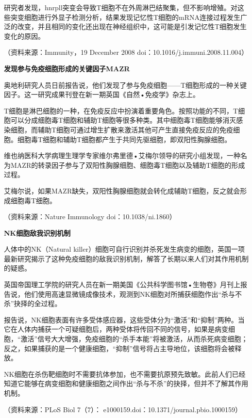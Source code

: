 研究者发现，hnrpll突变会导致T细胞不在外周淋巴结聚集，但不影响增殖。对这些突变细胞进行外显子检测分析，结果发现记忆性T细胞的mRNA连接过程发生广泛的改变，并且相同的变化还出现在神经组织中，这可能是引发记忆性T细胞发生变化的原因。

（资料来源：Immunity，19 December 2008
doi：10.1016/j.immuni.2008.11.004）

\begin{center}
\textbf{\Large 发现参与免疫细胞形成的关键因子MAZR}
\end{center}

奥地利研究人员日前报告说，他们发现了参与免疫细胞------T细胞形成的一种关键因子。这一研究成果刊登在新一期英国《自然•免疫学》杂志上。

T细胞是淋巴细胞的一种，在免疫反应中扮演着重要角色。按照功能的不同，T细胞可以分成细胞毒T细胞和辅助T细胞等很多种类。其中细胞毒T细胞能够消灭感染细胞，而辅助T细胞可通过增生扩散来激活其他可产生直接免疫反应的免疫细胞。细胞毒T细胞和辅助T细胞都产生于共同先驱细胞，即双阳性胸腺细胞。

维也纳医科大学病理生理学专家维尔弗里德•艾梅尔领导的研究小组发现，一种名为MAZR的转录因子参与了双阳性胸腺细胞、细胞毒T细胞以及辅助T细胞的形成过程。

艾梅尔说，如果MAZR缺失，双阳性胸腺细胞就会转化成辅助T细胞，反之就会形成细胞毒T细胞。

（资料来源：Nature Immunology doi：10.1038/ni.1860）

\begin{center}
\textbf{\Large NK细胞敌我识别机制}
\end{center}

人体中的NK（Natural
killer）细胞可自行识别并杀死发生病变的细胞，英国一项最新研究揭示了这种免疫细胞的敌我识别机制，解答了长期以来人们对其作用机制的疑惑。

英国帝国理工学院的研究人员在新一期美国《公共科学图书馆•生物卷》月刊上报告说，他们使用高速显微镜成像技术，观测到NK细胞对所捕获细胞作出“杀与不杀”抉择的全过程。

报告说，NK细胞表面有许多受体感应器，这些受体分为“激活”和“抑制”两种。当它在人体内捕获一个可疑细胞后，两种受体将传回不同的信号，如果是病变细胞，“激活”信号大大增强，免疫细胞的“杀手本能”将被激活，从而杀死病变细胞；反之，如果捕获的是一个健康细胞，“抑制”信号将占主导地位，该细胞将会被释放。

NK细胞在杀伤靶细胞时不需要抗体参加，也不需要抗原预先致敏。此前人们已经知道它能够在病变细胞和健康细胞之间作出“杀与不杀”的抉择，但并不了解其作用机制。

（资料来源：PLoS Biol 7（7）：
e1000159.doi：10.1371/journal.pbio.1000159）


